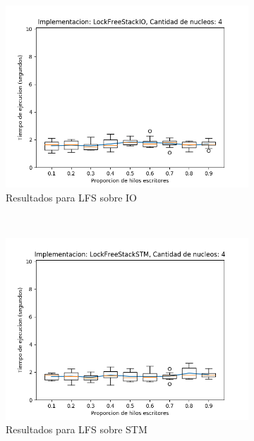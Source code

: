 \begin{appendices}
\begin{figure}[t]
\begin{subfigure}[b]{0.49\textwidth}
        \includegraphics[width=\textwidth]{images/pushPercentages/plots/expLFSIO-4}
        \caption{Resultados para LFS sobre IO}
        \label{subfig:pushPercentages-lfsio-4}
    \end{subfigure}
    ~
    \begin{subfigure}[b]{0.49\textwidth}
        \includegraphics[width=\textwidth]{images/pushPercentages/plots/expLFSSTM-4}
        \caption{Resultados para LFS sobre STM}
        \label{subfig:pushPercentages-lfsstm-4}
    \end{subfigure}
    \begin{subfigure}[b]{0.49\textwidth}

\end{subfigure}
\end{figure}
\end{appendices}
